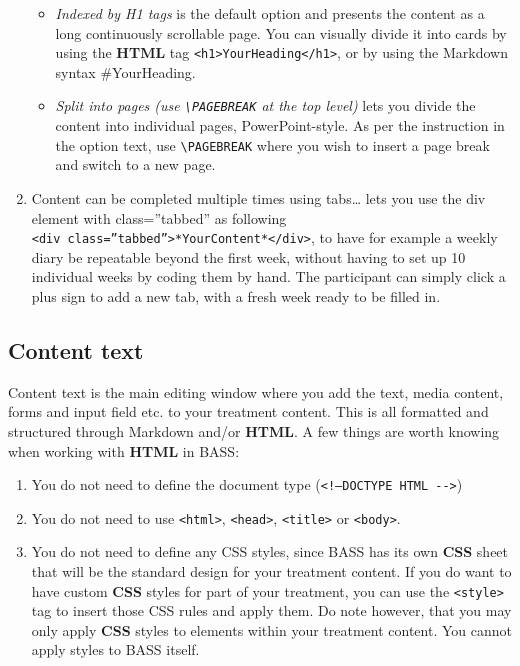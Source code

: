 \documentclass[]{book}
\providecommand{\tightlist}{%
  \setlength{\itemsep}{0pt}\setlength{\parskip}{0pt}}
\begin{document}
\begin{enumerate}
  \begin{itemize}
  \tightlist
  \item
    \emph{Indexed by H1 tags} is the default option and presents the content as a long continuously scrollable page. You can visually divide it into cards by using the \textbf{HTML} tag \texttt{\textless{}h1\textgreater{}YourHeading\textless{}/h1\textgreater{}}, or by using the Markdown syntax \#YourHeading.
  \item
    \emph{Split into pages (use \texttt{\textbackslash{}PAGEBREAK} at the top level)} lets you divide the content into individual pages, PowerPoint-style. As per the instruction in the option text, use \texttt{\textbackslash{}PAGEBREAK} where you wish to insert a page break and switch to a new page.
  \end{itemize}
\item
  Content can be completed multiple times using tabs\ldots{} lets you use the div element with class=''tabbed'' as following \texttt{\textless{}div\ class=”tabbed”\textgreater{}*YourContent*\textless{}/div\textgreater{}}, to have for example a weekly diary be repeatable beyond the first week, without having to set up 10 individual weeks by coding them by hand. The participant can simply click a plus sign to add a new tab, with a fresh week ready to be filled in.
\end{enumerate}

\hypertarget{content-text}{%
\subsection{Content text}\label{content-text}}

Content text is the main editing window where you add the text, media content, forms and input field etc. to your treatment content. This is all formatted and structured through Markdown and/or \textbf{HTML}.
A few things are worth knowing when working with \textbf{HTML} in BASS:

\begin{enumerate}
\def\labelenumi{\arabic{enumi}.}
\tightlist
\item
  You do not need to define the document type (\texttt{\textless{}!—DOCTYPE\ HTML\ -\/-\textgreater{}})
\item
  You do not need to use \texttt{\textless{}html\textgreater{}}, \texttt{\textless{}head\textgreater{}}, \texttt{\textless{}title\textgreater{}} or \texttt{\textless{}body\textgreater{}}.
\item
  You do not need to define any CSS styles, since BASS has its own \textbf{CSS} sheet that will be the standard design for your treatment content. If you do want to have custom \textbf{CSS} styles for part of your treatment, you can use the \texttt{\textless{}style\textgreater{}} tag to insert those CSS rules and apply them. Do note however, that you may only apply \textbf{CSS} styles to elements within your treatment content. You cannot apply styles to BASS itself.
\end{enumerate}
\end{document}
